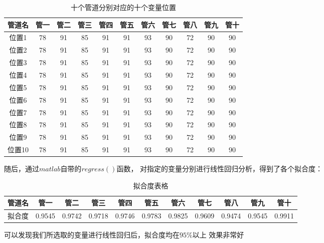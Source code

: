             \begin{table}
                \centering
                \begin{tabular}{|c|c|c|c|c|c|c|c|c|c|c|}
                    \hline
                    管道名&管一&管二&管三&管四&管五&管六&管七&管八&管九&管十\\
                    \hline
                    位置1&78&91&85&91&91&93&90&72&90&90\\
                    \hline
                    位置2&78&91&85&91&91&93&90&72&90&90\\
                    \hline
                    位置3&78&91&85&91&91&93&90&72&90&90\\
                    \hline
                    位置4&78&91&85&91&91&93&90&72&90&90\\
                    \hline
                    位置5&78&91&85&91&91&93&90&72&90&90\\
                    \hline
                    位置6&78&91&85&91&91&93&90&72&90&90\\
                    \hline
                    位置7&78&91&85&91&91&93&90&72&90&90\\
                    \hline
                    位置8&78&91&85&91&91&93&90&72&90&90\\
                    \hline
                    位置9&78&91&85&91&91&93&90&72&90&90\\
                    \hline
                    位置10&78&91&85&91&91&93&90&72&90&90\\
                    \hline
                \end{tabular}
                \caption{十个管道分别对应的十个变量位置}
                \label{shigeweizhi}
            \end{table}
            随后，通过$matlab$自带的$regress()$函数，
            对指定的变量分别进行线性回归分析，得到了各个拟合度：
            \begin{table}
                \centering
                \begin{tabular}{|c|c|c|c|c|c|c|c|c|c|c|}
                    \hline
                    管道名&管一&管二&管三&管四&管五&管六&管七&管八&管九&管十\\
                    \hline
                    拟合度&0.9545&0.9742&0.9718&0.9746&0.9783&0.9825&0.9609&0.9474&0.9545&0.9911\\
                    \hline
                \end{tabular}
                \caption{拟合度表格}
            \end{table}
            可以发现我们所选取的变量进行线性回归后，拟合度均在$95\%$以上
            效果非常好
